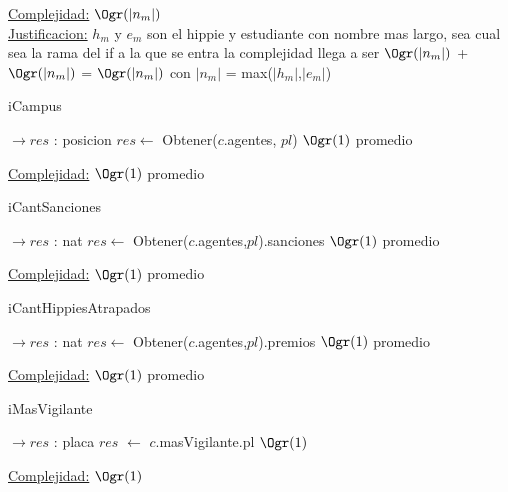 \begin{Representacion}
\begin{Algoritmos}
\begin{algorithm}[H]
\underline{Complejidad:} $\Ogr(|n_m|)$ \\
\underline{Justificacion:} $h_m$ y $e_m$ son el hippie y estudiante con nombre mas largo, sea cual sea la rama del if a la que se entra la complejidad llega a ser 
$\Ogr(|n_m|)$ + $\Ogr(|n_m|)$ = $\Ogr(|n_m|)$ con $|n_m|$ = max($|h_m|$,$|e_m|$)
\end{algorithm}


\begin{algorithm}[H]
\caption{iCampus}
\begin{algorithmic}[1]
  $\to res$ : posicion
  \State $res \gets$ Obtener($c$.agentes, $pl$) \Comment $\Ogr(1)$ promedio
 \EndProcedure
\end{algorithmic}

 \underline{Complejidad:} $\Ogr(1)$ promedio
\end{algorithm}


\begin{algorithm}[H]
\caption{iCantSanciones}

\begin{algorithmic}[1]
 $\to res$ : nat
	\State $res \gets$ Obtener($c$.agentes,$pl$).sanciones \Comment $\Ogr(1)$ promedio
\EndProcedure
\end{algorithmic}
\underline{Complejidad:} $\Ogr(1)$ promedio
\end{algorithm}


\begin{algorithm}[H]
\caption{iCantHippiesAtrapados}
\begin{algorithmic}[1]
 $\to res$ : nat
	\State $res \gets$ Obtener($c$.agentes,$pl$).premios \Comment $\Ogr(1)$ promedio
\EndProcedure
\end{algorithmic}
\underline{Complejidad:} $\Ogr(1)$ promedio
\end{algorithm}


\begin{algorithm}[H]
\caption{iMasVigilante}

\begin{algorithmic}[1]
 $\to res$ : placa
	\State $res$ $\gets$ $c$.masVigilante.pl \Comment $\Ogr(1)$
\EndProcedure
\end{algorithmic}

\underline{Complejidad:} $\Ogr(1)$
\end{algorithm}

\end{Algoritmos}

\end{Representacion}


